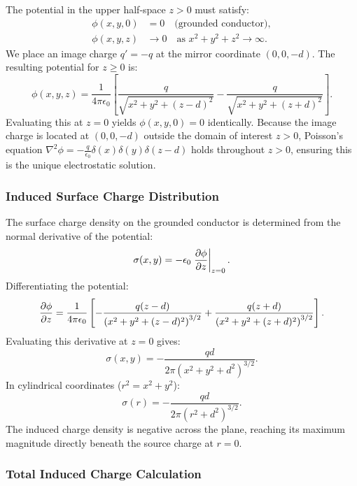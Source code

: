 The potential in the upper half-space \(z > 0\) must satisfy:
\begin{align}
    \phi(x, y, 0) &= 0 \quad \text{(grounded conductor)}, \\
    \phi(x, y, z) &\to 0 \quad \text{as } x^2 + y^2 + z^2 \to \infty.
\end{align}
We place an image charge \(q' = -q\) at the mirror coordinate \((0, 0, -d)\). The resulting potential for \(z \ge 0\) is:
\begin{equation}
    \phi(x, y, z) = \frac{1}{4\pi\epsilon_0} \left[ \frac{q}{\sqrt{x^2 + y^2 + (z - d)^2}} - \frac{q}{\sqrt{x^2 + y^2 + (z + d)^2}} \right].
\end{equation}
Evaluating this at \(z = 0\) yields \(\phi(x, y, 0) = 0\) identically. Because the image charge is located at \((0, 0, -d)\) outside the domain of interest \(z > 0\), Poisson's equation \(\nabla^2 \phi = -\frac{q}{\epsilon_0}\delta(x)\delta(y)\delta(z-d)\) holds throughout \(z > 0\), ensuring this is the unique electrostatic solution.

\subsubsection{Induced Surface Charge Distribution}

The surface charge density on the grounded conductor is determined from the normal derivative of the potential:
\begin{equation}
    \sigma(x, y) = -\epsilon_0 \left. \pdv{\phi}{z} \right|_{z=0}.
\end{equation}
Differentiating the potential:
\begin{equation}
    \pdv{\phi}{z} = \frac{1}{4\pi\epsilon_0} \left[ -\frac{q(z - d)}{\left(x^2 + y^2 + (z - d)^2\right)^{3/2}} + \frac{q(z + d)}{\left(x^2 + y^2 + (z + d)^2\right)^{3/2}} \right].
\end{equation}
Evaluating this derivative at \(z = 0\) gives:
\begin{equation}
    \sigma(x, y) = -\frac{qd}{2\pi \left(x^2 + y^2 + d^2\right)^{3/2}}.
\end{equation}
In cylindrical coordinates (\(r^2 = x^2 + y^2\)):
\begin{equation}
    \sigma(r) = -\frac{qd}{2\pi \left(r^2 + d^2\right)^{3/2}}.
\end{equation}
The induced charge density is negative across the plane, reaching its maximum magnitude directly beneath the source charge at \(r = 0\).

\subsubsection{Total Induced Charge Calculation}

